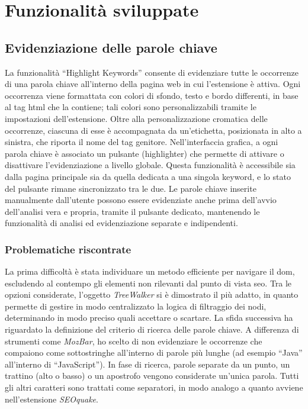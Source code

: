 \chapter{Funzionalità sviluppate}
\label{cap:funzionalità-sviluppate}

\section{Evidenziazione delle parole chiave}
\label{sec:highlight-keyword}

\par La funzionalità “Highlight Keywords” consente di evidenziare tutte le occorrenze di una parola chiave all’interno della pagina web in cui l’estensione è attiva. Ogni occorrenza viene formattata con colori di sfondo, testo e bordo differenti, in base al tag \gls{html} che la contiene; tali colori sono personalizzabili tramite le impostazioni dell’estensione. Oltre alla personalizzazione cromatica delle occorrenze, ciascuna di esse è accompagnata da un’etichetta, posizionata in alto a sinistra, che riporta il nome del tag genitore. Nell’interfaccia grafica, a ogni parola chiave è associato un pulsante (highlighter) che permette di attivare o disattivare l’evidenziazione a livello globale. Questa funzionalità è accessibile sia dalla pagina principale sia da quella dedicata a una singola keyword, e lo stato del pulsante rimane sincronizzato tra le due. Le parole chiave inserite manualmente dall'utente possono essere evidenziate anche prima dell’avvio dell’analisi vera e propria, tramite il pulsante dedicato, mantenendo le funzionalità di analisi ed evidenziazione separate e indipendenti.

\subsection{Problematiche riscontrate}

\par La prima difficoltà è stata individuare un metodo efficiente per navigare il \gls{dom}, escludendo al contempo gli elementi non rilevanti dal punto di vista \gls{seo}. Tra le opzioni considerate, l’oggetto \textit{TreeWalker} si è dimostrato il più adatto, in quanto permette di gestire in modo centralizzato la logica di filtraggio dei nodi, determinando in modo preciso quali accettare o scartare. La sfida successiva ha riguardato la definizione del criterio di ricerca delle parole chiave. A differenza di strumenti come \textit{MozBar}, ho scelto di non evidenziare le occorrenze che compaiono come sottostringhe all’interno di parole più lunghe (ad esempio “Java” all’interno di “JavaScript”). In fase di ricerca, parole separate da un punto, un trattino (alto o basso) o un apostrofo vengono considerate un’unica parola. Tutti gli altri caratteri sono trattati come separatori, in modo analogo a quanto avviene nell’estensione \textit{SEOquake}.

